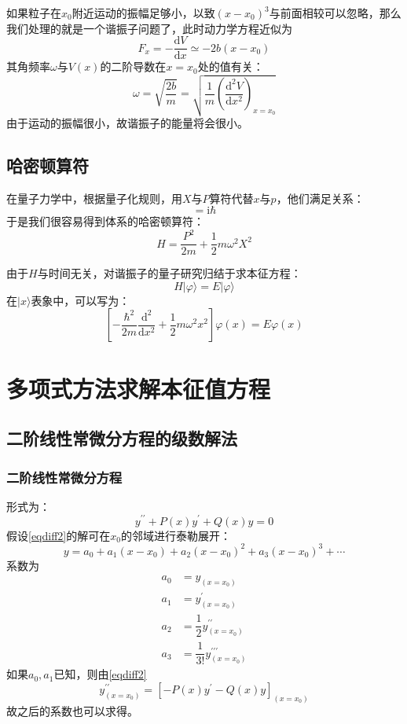 \documentclass[]{article}
\begin{document}
如果粒子在$x_0$附近运动的振幅足够小，以致$(x-x_0)^3$与前面相较可以忽略，那么我们处理的就是一个谐振子问题了，此时动力学方程近似为
\begin{equation}
	F_x=-\dfrac{\mathrm{d}V}{\mathrm{d}x}\simeq-2b(x-x_0)
\end{equation}
其角频率$\omega$与$V(x)$的二阶导数在$x=x_0$处的值有关：
\begin{equation}
	\omega=\sqrt{\dfrac{2b}{m}}=\sqrt{\dfrac{1}{m}\left(\dfrac{\mathrm{d}^2V}{\mathrm{d}x^2} \right) _{x=x_0}}
\end{equation}
由于运动的振幅很小，故谐振子的能量将会很小。
\subsection{哈密顿算符}
在量子力学中，根据量子化规则，用$X$与$P$算符代替$x$与$p$，他们满足关系：
\begin{equation}
	[X,P]=\mathrm{i}\hbar 
	\label{XP-PX}
\end{equation}
于是我们很容易得到体系的哈密顿算符：
\begin{equation}
	H=\dfrac{P^2}{2m}+\dfrac{1}{2}m\omega^2X^2
\end{equation}

由于$H$与时间无关，对谐振子的量子研究归结于求本征方程：
\begin{equation}
	H|\varphi\rangle=E|\varphi\rangle
\end{equation}
在${|x\rangle}$表象中，可以写为：
\begin{equation}
	\left[ -\dfrac{\hbar^2}{2m}\dfrac{\mathrm{d}^2}{\mathrm{d}x^2}+\dfrac{1}{2}m\omega^2x^2\right] \varphi(x)=E\varphi(x)
	\label{eigeneq}
\end{equation}
\section{多项式方法求解本征值方程}
\subsection{二阶线性常微分方程的级数解法}
\subsubsection{二阶线性常微分方程}
形式为：
\begin{equation}
	y^{\prime\prime}+P(x)y^{\prime}+Q(x)y=0
	\label{eqdiff2}
\end{equation}
假设\eqref{eqdiff2}的解可在$x_0$的邻域进行泰勒展开：
\begin{equation}
	y=a_0+a_1(x-x_0)+a_2(x-x_0)^2+a_3(x-x_0)^3+\cdots
\end{equation}
系数为
\begin{align}
	a_0&=y_{(x=x_0)}\nonumber\\
	a_1&=y^{\prime}_{(x=x_0)}\nonumber\\
	a_2&=\dfrac{1}{2}y^{\prime\prime}_{(x=x_0)}\nonumber\\
	a_3&=\dfrac{1}{3!}y^{\prime\prime\prime}_{(x=x_0)}
\end{align}
如果$a_0,a_1$已知，则由\eqref{eqdiff2}
\begin{equation}
	y^{\prime\prime}_{(x=x_0)}=[-P(x)y^{\prime}-Q(x)y]_{(x=x_0)}
\end{equation}
故之后的系数也可以求得。
\end{document}
